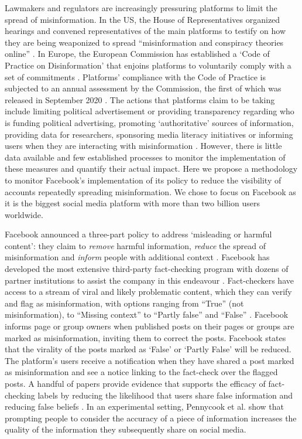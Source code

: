 \documentclass[review]{elsarticle}
\begin{document}
Lawmakers and regulators are increasingly pressuring platforms to limit the spread of misinformation. 
In the US, the House of Representatives organized hearings and convened representatives of the main platforms to testify on how they are being weaponized to spread ``misinformation and conspiracy theories online'' \citep{donovan2020}. 
In Europe, the European Commission has established a `Code of Practice on Disinformation' \citep{codePracticeMisinformation} that enjoins platforms to voluntarily comply with a set of commitments \citep{heldt2019let}.
Platforms' compliance with the Code of Practice is subjected to an annual assessment by the Commission, the first of which was released in September 2020 \citep{firstEUassess}.
The actions that platforms claim to be taking include limiting political advertisement or providing transparency regarding who is funding political advertising, promoting `authoritative' sources of information, providing data for researchers, sponsoring media literacy initiatives or informing users when they are interacting with misinformation \citep{selfassessment}.
However, there is little data available and few established processes to monitor the implementation of these measures and quantify their actual impact. 
Here we propose a methodology to monitor Facebook’s implementation of its policy to reduce the visibility of accounts repeatedly spreading misinformation. 
We chose to focus on Facebook as it is the biggest social media platform with more than two billion users worldwide.

Facebook announced a three-part policy to address ‘misleading or harmful content’: they claim to \textit{remove} harmful information, \textit{reduce} the spread of misinformation and \textit{inform} people with additional context \citep{threePartRecipe}. 
Facebook has developed the most extensive third-party fact-checking program with dozens of partner institutions to assist the company in this endeavour \citep{60factCheckingPartners}.
Fact-checkers have access to a stream of viral and likely problematic content, which they can verify and flag as misinformation, with options ranging from ``True'' (not misinformation), to ``Missing context'' to ``Partly false'' and ``False'' \citep{RatingOptions}.
Facebook informs page or group owners when published posts on their pages or groups are marked as misinformation, inviting them to correct the posts.
Facebook states that the virality of the posts marked as `False' or `Partly False' will be reduced.
The platform's users receive a notification when they have shared a post marked as misinformation and see a notice linking to the fact-check over the flagged posts. 
A handful of papers provide evidence that supports the efficacy of fact-checking labels by reducing the likelihood that users share false information \citep{mena2020cleaning} and reducing false beliefs \citep{porter2021global}. 
In an experimental setting, Pennycook et al. \cite{pennycook2020understanding} show that prompting people to consider the accuracy of a piece of information increases the quality of the information they subsequently share on social media.
\end{document}
